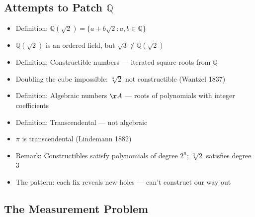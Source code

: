 \documentclass[
  10pt,
  letterpaper,
]{scrbook}
\providecommand{\tightlist}{%
  \setlength{\itemsep}{0pt}\setlength{\parskip}{0pt}}
\newcommand{\QQ}{\mathbb{Q}}
\begin{document}
\subsection{\texorpdfstring{Attempts to Patch
\(\QQ\)}{Attempts to Patch \textbackslash QQ}}\label{attempts-to-patch-qq}

\begin{itemize}
\tightlist
\item
  Definition: \(\QQ(\sqrt{2}) = \{a + b\sqrt{2} : a, b \in \QQ\}\)
\item
  \(\QQ(\sqrt{2})\) is an ordered field, but
  \(\sqrt{3} \notin \QQ(\sqrt{2})\)
\item
  Definition: Constructible numbers --- iterated square roots from
  \(\QQ\)
\item
  Doubling the cube impossible: \(\sqrt[3]{2}\) not constructible
  (Wantzel 1837)
\item
  Definition: Algebraic numbers \(\AA\) --- roots of polynomials with
  integer coefficients
\item
  Definition: Transcendental --- not algebraic
\item
  \(\pi\) is transcendental (Lindemann 1882)
\item
  Remark: Constructibles satisfy polynomials of degree \(2^n\);
  \(\sqrt[3]{2}\) satisfies degree 3
\item
  The pattern: each fix reveals new holes --- can't construct our way
  out
\end{itemize}

\subsection{The Measurement Problem}\label{the-measurement-problem}
\end{document}

